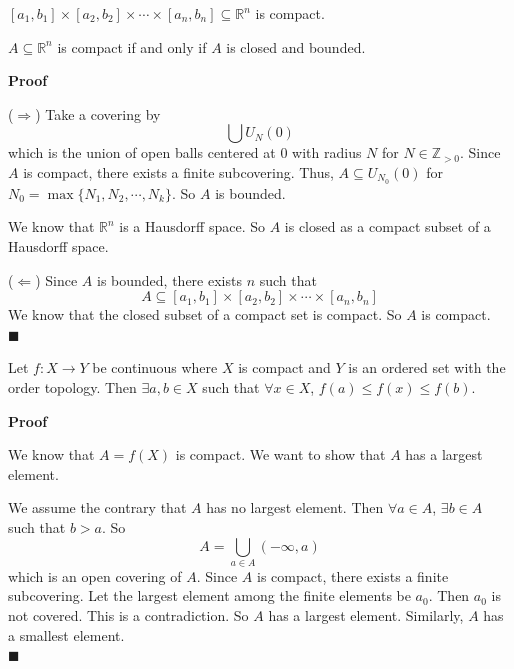 \documentclass[main.tex]{subfiles}
\begin{document}
\begin{corollary}
    $[a_1, b_1] \times [a_2, b_2] \times \cdots \times [a_n, b_n] \subseteq \mathbb{R}^n$ is compact.
\end{corollary}

\begin{theorem}
    $A \subseteq \mathbb{R}^n$ is compact if and only if $A$ is closed and bounded.
\end{theorem}
\par \noindent \textbf{Proof} 
\par ($\Rightarrow$) Take a covering by 
\begin{equation}
    \bigcup U_N(0)
\end{equation} 
which is the union of open balls centered at $0$ with radius $N$ for $N \in \mathbb{Z}_{>0}$. Since $A$ is compact, there exists a finite subcovering. Thus, $A \subseteq U_{N_0}(0)$ for $N_0 = \max\{N_1, N_2, \cdots, N_k\}$. So $A$ is bounded. 
\par We know that $\mathbb{R}^n$ is a Hausdorff space. So $A$ is closed as a compact subset of a Hausdorff space.
\par ($\Leftarrow$) Since $A$ is bounded, there exists $n$ such that
\begin{equation}
    A \subseteq [a_1, b_1] \times [a_2, b_2] \times \cdots \times [a_n, b_n]
\end{equation}
We know that the closed subset of a compact set is compact. So $A$ is compact.
\mbox{} \\ \null \hfill $\blacksquare$ 

\begin{theorem}
    Let $f: X \rightarrow Y$ be continuous where $X$ is compact and $Y$ is an ordered set with the order topology. Then $\exists a, b \in X$ such that $\forall x\in X$, $f(a) \le f(x) \le f(b)$.
\end{theorem}

\par \noindent \textbf{Proof} 
\par We know that $A = f(X)$ is compact. We want to show that $A$ has a largest element. 
\par We assume the contrary that $A$ has no largest element. Then $\forall a \in A$, $\exists b \in A$ such that $b > a$. So 
\begin{equation}
    A = \bigcup_{a \in A} (-\infty, a)
\end{equation}
which is an open covering of $A$. Since $A$ is compact, there exists a finite subcovering. Let the largest element among the finite elements be $a_0$. Then $a_0$ is not covered. This is a contradiction. So $A$ has a largest element. Similarly, $A$ has a smallest element. 
\mbox{} \\ \null \hfill $\blacksquare$ 
\end{document}
